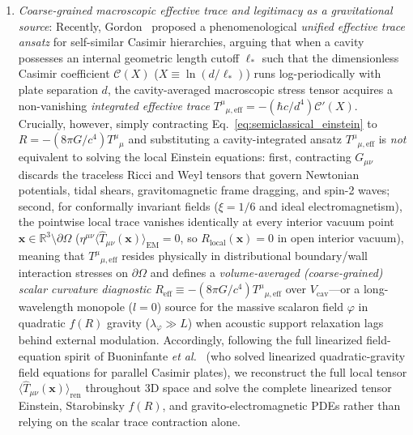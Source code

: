 \documentclass[aps,prd,twocolumn,10pt,showkeys,nofootinbib,floatfix,longbibliography]{revtex4-2}
\begin{document}
\begin{enumerate}
    \item \emph{Coarse-grained macroscopic effective trace and legitimacy as a gravitational source}: Recently, Gordon~\cite{gordon2026prd} proposed a phenomenological \emph{unified effective trace ansatz} for self-similar Casimir hierarchies, arguing that when a cavity possesses an internal geometric length cutoff $\ell_*$ such that the dimensionless Casimir coefficient $\mathcal{C}(X)$ ($X \equiv \ln(d/\ell_*)$) runs log-periodically with plate separation $d$, the cavity-averaged macroscopic stress tensor acquires a non-vanishing \emph{integrated effective trace} $T^\mu{}_{\mu,\mathrm{eff}} = -(\hbar c/d^4)\mathcal{C}'(X)$. Crucially, however, simply contracting Eq.~\eqref{eq:semiclassical_einstein} to $R = -(8\pi G/c^4)T^\mu{}_\mu$ and substituting a cavity-integrated ansatz $T^\mu{}_{\mu,\mathrm{eff}}$ is \emph{not} equivalent to solving the local Einstein equations: first, contracting $G_{\mu\nu}$ discards the traceless Ricci and Weyl tensors that govern Newtonian potentials, tidal shears, gravitomagnetic frame dragging, and spin-2 waves; second, for conformally invariant fields ($\xi = 1/6$ and ideal electromagnetism), the pointwise local trace vanishes identically at every interior vacuum point $\mathbf{x} \in \mathbb{R}^3 \setminus \partial\Omega$ ($\eta^{\mu\nu}\langle\hat{T}_{\mu\nu}(\mathbf{x})\rangle_{\mathrm{EM}} = 0$, so $R_{\mathrm{local}}(\mathbf{x}) = 0$ in open interior vacuum), meaning that $T^\mu{}_{\mu,\mathrm{eff}}$ resides physically in distributional boundary/wall interaction stresses on $\partial\Omega$ and defines a \emph{volume-averaged (coarse-grained) scalar curvature diagnostic} $R_{\mathrm{eff}} \equiv -(8\pi G/c^4)T^\mu{}_{\mu,\mathrm{eff}}$ over $V_{\mathrm{cav}}$---or a long-wavelength monopole ($l=0$) source for the massive scalaron field $\varphi$ in quadratic $f(R)$ gravity ($\lambda_\varphi \gg L$) when acoustic support relaxation lags behind external modulation. Accordingly, following the full linearized field-equation spirit of Buoninfante \emph{et al.}~\cite{buoninfante2019epjc} (who solved linearized quadratic-gravity field equations for parallel Casimir plates), we reconstruct the full local tensor $\langle\hat{T}_{\mu\nu}(\mathbf{x})\rangle_{\mathrm{ren}}$ throughout 3D space and solve the complete linearized tensor Einstein, Starobinsky $f(R)$, and gravito-electromagnetic PDEs rather than relying on the scalar trace contraction alone.
\end{enumerate}
\end{document}
